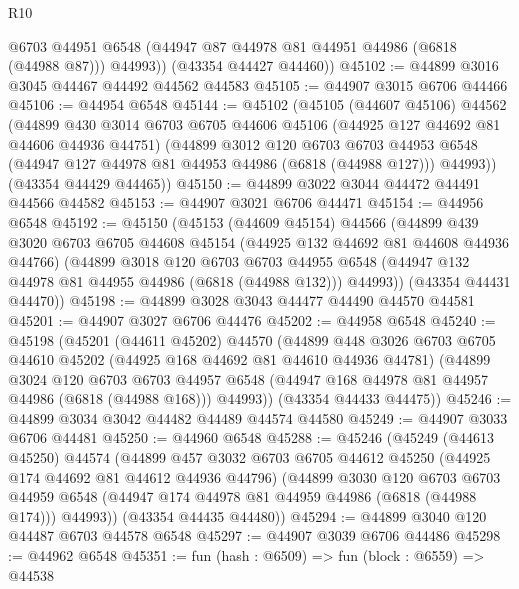 \begin{lexlean}{R10}
\begin{coremodule}
          @6703
          @44951
          @6548
          (@44947 @87 @44978 @81 @44951 @44986 (@6818 (@44988 @87)))
          @44993))
      (@43354 @44427 @44460))
@45102 := @44899 @3016 @3045 @44467 @44492 @44562 @44583
@45105 := @44907 @3015 @6706 @44466
@45106 := @44954 @6548
@45144 := @45102
    (@45105
      (@44607 @45106)
      @44562
      (@44899
        @430
        @3014
        @6703
        @6705
        @44606
        @45106
        (@44925 @127 @44692 @81 @44606 @44936 @44751)
        (@44899
          @3012
          @120
          @6703
          @6703
          @44953
          @6548
          (@44947 @127 @44978 @81 @44953 @44986 (@6818 (@44988 @127)))
          @44993))
      (@43354 @44429 @44465))
@45150 := @44899 @3022 @3044 @44472 @44491 @44566 @44582
@45153 := @44907 @3021 @6706 @44471
@45154 := @44956 @6548
@45192 := @45150
    (@45153
      (@44609 @45154)
      @44566
      (@44899
        @439
        @3020
        @6703
        @6705
        @44608
        @45154
        (@44925 @132 @44692 @81 @44608 @44936 @44766)
        (@44899
          @3018
          @120
          @6703
          @6703
          @44955
          @6548
          (@44947 @132 @44978 @81 @44955 @44986 (@6818 (@44988 @132)))
          @44993))
      (@43354 @44431 @44470))
@45198 := @44899 @3028 @3043 @44477 @44490 @44570 @44581
@45201 := @44907 @3027 @6706 @44476
@45202 := @44958 @6548
@45240 := @45198
    (@45201
      (@44611 @45202)
      @44570
      (@44899
        @448
        @3026
        @6703
        @6705
        @44610
        @45202
        (@44925 @168 @44692 @81 @44610 @44936 @44781)
        (@44899
          @3024
          @120
          @6703
          @6703
          @44957
          @6548
          (@44947 @168 @44978 @81 @44957 @44986 (@6818 (@44988 @168)))
          @44993))
      (@43354 @44433 @44475))
@45246 := @44899 @3034 @3042 @44482 @44489 @44574 @44580
@45249 := @44907 @3033 @6706 @44481
@45250 := @44960 @6548
@45288 := @45246
    (@45249
      (@44613 @45250)
      @44574
      (@44899
        @457
        @3032
        @6703
        @6705
        @44612
        @45250
        (@44925 @174 @44692 @81 @44612 @44936 @44796)
        (@44899
          @3030
          @120
          @6703
          @6703
          @44959
          @6548
          (@44947 @174 @44978 @81 @44959 @44986 (@6818 (@44988 @174)))
          @44993))
      (@43354 @44435 @44480))
@45294 := @44899 @3040 @120 @44487 @6703 @44578 @6548
@45297 := @44907 @3039 @6706 @44486
@45298 := @44962 @6548
@45351 := fun (hash : @6509) =>
  fun (block : @6559) =>
  @44538

\end{coremodule}
\end{lexlean}

